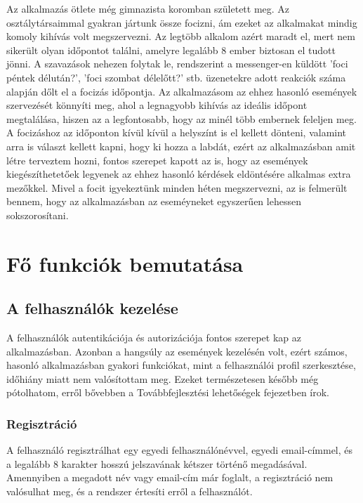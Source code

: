 \documentclass[a4paper,12pt]{report}
\theoremstyle{definition}
\theoremstyle{remark}
\begin{document}
Az alkalmazás ötlete még gimnazista koromban született meg. Az osztálytársaimmal gyakran jártunk össze focizni, ám ezeket az alkalmakat mindig komoly kihívás volt megszervezni. Az legtöbb alkalom azért maradt el, mert nem sikerült olyan időpontot találni, amelyre legalább 8 ember biztosan el tudott jönni. A szavazások nehezen folytak le, rendszerint a messenger-en küldött 'foci péntek délután?', 'foci szombat délelőtt?' stb. üzenetekre adott reakciók száma alapján dőlt el a focizás időpontja. Az alkalmazásom az ehhez hasonló események szervezését könnyíti meg, ahol a legnagyobb kihívás az ideális időpont megtalálása, hiszen az a legfontosabb, hogy az minél több embernek feleljen meg. A focizáshoz az időponton kívül kívül a helyszínt is el kellett dönteni, valamint arra is választ kellett kapni, hogy ki hozza a labdát, ezért az alkalmazásban amit létre terveztem hozni, fontos szerepet kapott az is, hogy az események kiegészíthetetőek legyenek az ehhez hasonló kérdések eldöntésére alkalmas extra mezőkkel. Mivel a focit igyekeztünk minden héten megszervezni, az is felmerült bennem, hogy az alkalmazásban az eseméyneket egyszerűen lehessen sokszorosítani.

\chapter{Fő funkciók bemutatása}

\section{A felhasználók kezelése}

A felhasználók autentikációja és autorizációja fontos szerepet kap az alkalmazásban. Azonban a hangsúly az események kezelésén volt, ezért számos, hasonló alkalmazásban gyakori funkciókat, mint a felhasználói profil szerkesztése, időhiány miatt nem valósítottam meg. Ezeket természetesen később még pótolhatom, erről bővebben a Továbbfejlesztési lehetőségek fejezetben írok.

	\subsection{Regisztráció}

A felhasználó regisztrálhat egy egyedi felhasználónévvel, egyedi email-címmel, és a legalább 8 karakter hosszú jelszavának kétszer történő megadásával. Amennyiben a megadott név vagy email-cím már foglalt, a regisztráció nem valósulhat meg, és a rendszer értesíti erről a felhasználót.
\end{document}
